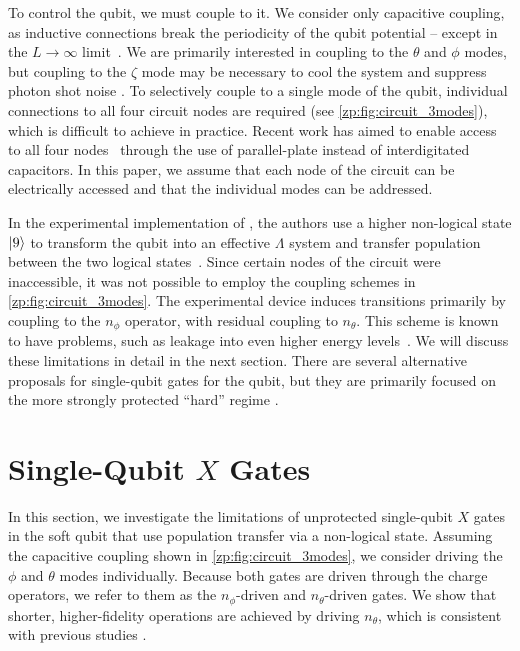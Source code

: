 To control the \zps qubit, we must couple to it.
We consider only capacitive coupling, as inductive connections break the periodicity of the qubit potential -- except in the $L \to \infty$ limit~\cite{paolo_control_2019}.
We are primarily interested in coupling to the $\theta$ and $\phi$ modes, but coupling to the $\zeta$ mode may be necessary to cool the system and suppress photon shot noise \cite{paolo_control_2019}.
To selectively couple to a single mode of the \zps qubit, individual connections to all four circuit nodes are required (see \cref{zp:fig:circuit_3modes}), which is difficult to achieve in practice.
Recent work has aimed to enable access to all four nodes~\cite{KimAPS2024,kim2025protected} through the use of parallel-plate instead of interdigitated capacitors.
In this paper, we assume that each node of the \zps circuit can be electrically accessed and that the individual modes can be addressed.

In the experimental implementation of \zp, the authors use a higher non-logical state $\ket{9}$ to transform the qubit into an effective $\Lambda$ system and transfer population between the two logical states~\cite{Gyenis_zero_pi_2021a}.
Since certain nodes of the circuit were inaccessible, it was not possible to employ the coupling schemes in \cref{zp:fig:circuit_3modes}.
The experimental device induces transitions primarily by coupling to the $n_\phi$ operator, with residual coupling to $n_\theta$.
This scheme is known to have problems, such as leakage into even higher energy levels~\cite{PremkumarAPS2023,premkumar2023hamiltonian}.
We will discuss these limitations in detail in the next section.
There are several alternative proposals for single-qubit gates for the \zps qubit, but they are primarily focused on the more strongly protected ``hard'' \zps regime \cite{paolo_control_2019,kolesnikowProtectedPhaseGate2026}.

\section{Single-Qubit \texorpdfstring{$X$}{X} Gates}
\label{zp:sec:1q}
In this section, we investigate the limitations of unprotected single-qubit $X$ gates in the soft \zps qubit that use population transfer via a non-logical state.
Assuming the capacitive coupling shown in \cref{zp:fig:circuit_3modes}, we consider driving the $\phi$ and $\theta$ modes individually.
Because both gates are driven through the charge operators, we refer to them as the $n_\phi$-driven and $n_\theta$-driven gates.
We show that shorter, higher-fidelity operations are achieved by driving $n_\theta$, which is consistent with previous studies \cite{abdelhafez2020universal}.

